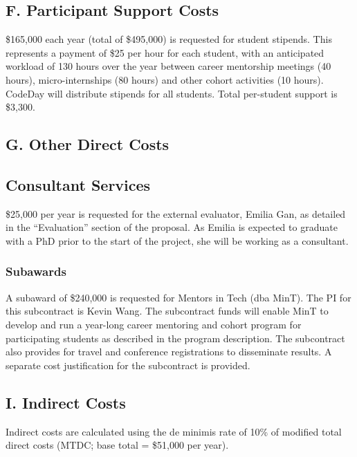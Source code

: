 \subsection{F. Participant Support Costs}
\$165,000 each year (total of \$495,000) is requested for student stipends. This represents a payment of \$25 per hour for each student, with an anticipated workload of 130 hours over the year between career mentorship meetings (40 hours), micro-internships (80 hours) and other cohort activities (10 hours). CodeDay will distribute stipends for all students. Total per-student support is \$3,300.

\subsection{G. Other Direct Costs}

\subsection{Consultant Services}
\$25,000 per year is requested for the external evaluator, Emilia Gan, as detailed in the ``Evaluation'' section of the proposal. As Emilia is expected to graduate with a PhD prior to the start of the project, she will be working as a consultant.

\subsubsection{Subawards}
A subaward of \$240,000 is requested for Mentors in Tech (dba MinT). The PI for this subcontract is Kevin Wang. The subcontract funds will enable MinT to develop and run a year-long career mentoring and cohort program for participating students as described in the program description. The subcontract also provides for travel and conference registrations to disseminate results. A separate cost justification for the subcontract is provided.

\subsection{I. Indirect Costs}
Indirect costs are calculated using the de minimis rate of 10\% of modified total direct costs (MTDC; base total = \$51,000 per year).